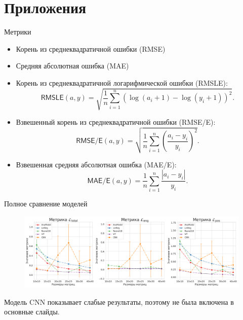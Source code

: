 \documentclass[9pt]{beamer}
\begin{document}
\section{Приложения}

\begin{frame}{Метрики}
    \begin{itemize}
        \item Корень из среднеквадратичной ошибки (\textsf{RMSE})
        \item Средняя абсолютная ошибка (\textsf{MAE})
        \item Корень из среднеквадратичной логарифмической ошибки (\textsf{RMSLE}): \[ \textsf{RMSLE}(a, y) = \sqrt{\frac{1}{n} \sum_{i = 1}^{n} (\log(a_i + 1) - \log(y_i + 1))^2} . \]
        \item Взвешенный корень из среднеквадратичной ошибки (\textsf{RMSE/E}): \[ \textsf{RMSE/E}(a, y) = \sqrt{\frac{1}{n} \sum_{i = 1}^{n} \left( \frac{a_i - y_i}{y_i} \right)^2} . \]
        \item Взвешенная средняя абсолютная ошибка (\textsf{MAE/E}): \[ \textsf{MAE/E}(a, y) = \frac{1}{n} \sum_{i = 1}^{n} \frac{|a_i - y_i|}{y_i} . \]
    \end{itemize}
\end{frame}

\begin{frame}{Полное сравнение моделей}
    \begin{figure}
        \centering
        \includegraphics[width=1.0\textwidth]{../report/graphics/models_comp_extra.png}
    \end{figure}

    \begin{block}{}
        Модель CNN показывает слабые результаты, поэтому не была включена в основные слайды.
    \end{block}
\end{frame}
\end{document}
